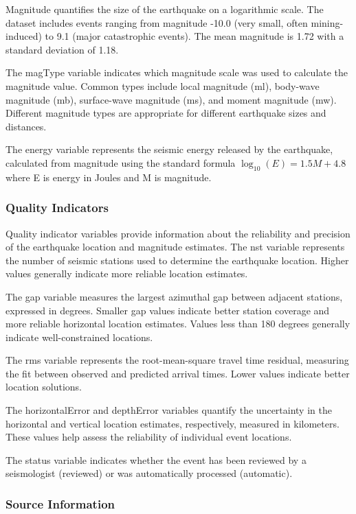 Magnitude quantifies the size of the earthquake on a logarithmic scale. The dataset includes events ranging from magnitude -10.0 (very small, often mining-induced) to 9.1 (major catastrophic events). The mean magnitude is 1.72 with a standard deviation of 1.18.

The magType variable indicates which magnitude scale was used to calculate the magnitude value. Common types include local magnitude (ml), body-wave magnitude (mb), surface-wave magnitude (ms), and moment magnitude (mw). Different magnitude types are appropriate for different earthquake sizes and distances.

The energy variable represents the seismic energy released by the earthquake, calculated from magnitude using the standard formula $\log_{10}(E) = 1.5M + 4.8$ where E is energy in Joules and M is magnitude.

\subsubsection{Quality Indicators}

Quality indicator variables provide information about the reliability and precision of the earthquake location and magnitude estimates. The nst variable represents the number of seismic stations used to determine the earthquake location. Higher values generally indicate more reliable location estimates.

The gap variable measures the largest azimuthal gap between adjacent stations, expressed in degrees. Smaller gap values indicate better station coverage and more reliable horizontal location estimates. Values less than 180 degrees generally indicate well-constrained locations.

The rms variable represents the root-mean-square travel time residual, measuring the fit between observed and predicted arrival times. Lower values indicate better location solutions.

The horizontalError and depthError variables quantify the uncertainty in the horizontal and vertical location estimates, respectively, measured in kilometers. These values help assess the reliability of individual event locations.

The status variable indicates whether the event has been reviewed by a seismologist (reviewed) or was automatically processed (automatic).

\subsubsection{Source Information}

